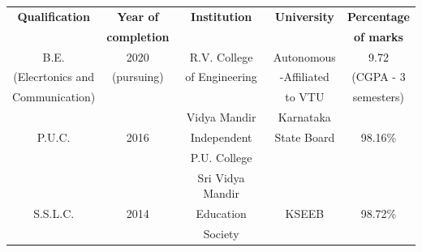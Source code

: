 \documentclass[letterpaper,11pt,oneside]{article}
\begin{document}
    \\
    \\
    \\
    \\
    \\
    \\
    \\
    \begin{tabular}{ |c|c|c|c|c| } 
    	\hline
    	\Large{\textbf{Qualification}} & \Large{\textbf{Year of}} & \Large{\textbf{Institution}} & \Large{\textbf{University}} & \Large{\textbf{Percentage}} \\
    	& \Large{\textbf{completion}} & & & \Large{\textbf{of marks}} \\
    	\hline
    	
    	B.E. & 2020 & R.V. College & Autonomous & 9.72 \\
    	(Elecrtonics and & (pursuing) & of Engineering & -Affiliated & (CGPA - 3\\
    	Communication) & & & to VTU & semesters) \\
    	\hline
    	
    	& & Vidya Mandir & Karnataka & \\
    	P.U.C. & 2016 & Independent & State Board &  98.16\% \\
    	&  & P.U. College & & \\
    	
    	\hline
    	& & Sri Vidya Mandir & &\\
    	S.S.L.C. & 2014 & Education & KSEEB & 98.72\% \\
    	& & Society & & \\
    	
    	\hline
    \end{tabular}
    
    \vspace{2ex}
    \pagebreak
    
\end{document}
